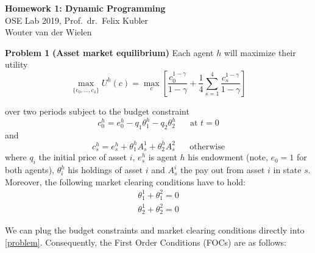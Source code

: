 \documentclass[letterpaper,12pt]{article}
\theoremstyle{definition}
\begin{document}
\begin{flushleft}
  \textbf{\large{Homework 1: Dynamic Programming}} \\
  OSE Lab 2019, Prof.\ dr.\ Felix Kubler \\
  Wouter van der Wielen
\end{flushleft}

\vspace{5mm}

\noindent\textbf{Problem 1}
\textbf{(Asset market equilibrium)}
Each agent $h$ will maximize their utility
\begin{equation} \label{problem}
	\max_{\{c_0, ..., c_4\}} U^{h}(c) = \max_{c} \left[ \frac{c_0^{1-\gamma}}{1-\gamma} + \frac{1}{4}\sum_{s=1}^{4} \frac{c_s^{1-\gamma}}{1-\gamma} \right]
\end{equation}

\noindent over two periods subject to the budget constraint
\begin{equation}
	c_0^h = e_0^h - q_1\theta_1^h - q_2\theta_2^h \hspace{20pt} \text{at } t = 0
\end{equation}
\noindent and
\begin{equation}
	c_s^h = e_s^h + \theta_1^h A_s^1 + \theta_2^h A_s^2 \hspace{20pt} \text{otherwise}
\end{equation}
\noindent where $q_i$ the initial price of asset $i$, $e_s^h$ is agent $h$ his endowment (note, $e_0=1$ for both agents), $\theta_i^h$ his holdings of asset $i$ and $A_s^i$ the pay out from asset $i$ in state $s$. Moreover, the following market clearing conditions have to hold:
\begin{align}
	\theta_1^1 + \theta_1^2 = 0 \\
	\theta_2^1 + \theta_2^2 = 0
\end{align}

We can plug the budget constraints and market clearing conditions 
directly into \eqref{problem}. Consequently, the First Order Conditions (FOCs) are as follows:
\end{document}
